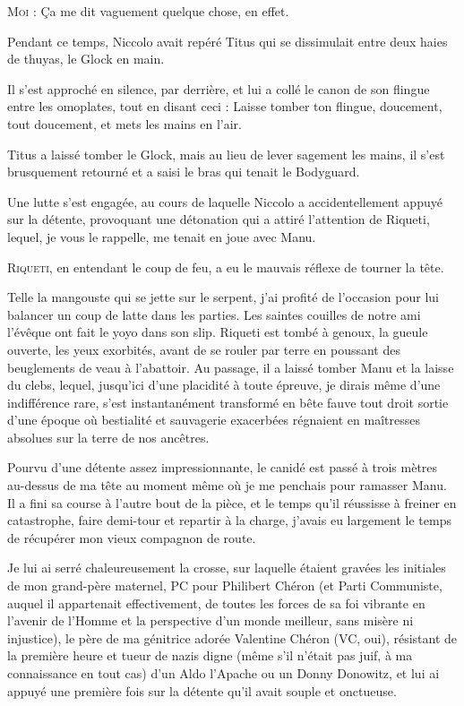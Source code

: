 \textsc{Moi} : Ça me dit vaguement quelque chose, en effet.

Pendant ce temps, Niccolo avait repéré Titus qui se dissimulait entre deux haies de thuyas, le Glock en main.

Il s’est approché en silence, par derrière, et lui a collé le canon de son flingue entre les omoplates, tout en disant ceci : Laisse tomber ton flingue, doucement, tout doucement, et mets les mains en l’air.

Titus a laissé tomber le Glock, mais au lieu de lever sagement les mains, il s’est brusquement retourné et a saisi le bras qui tenait le Bodyguard.

Une lutte s’est engagée, au cours de laquelle Niccolo a accidentellement appuyé sur la détente, provoquant une détonation qui a attiré l’attention de Riqueti, lequel, je vous le rappelle, me tenait en joue avec Manu.

\textsc{Riqueti}, en entendant le coup de feu, a eu le mauvais réflexe de tourner la tête.

Telle la mangouste qui se jette sur le serpent, j’ai profité de l’occasion pour lui balancer un coup de latte dans les parties. Les saintes couilles de notre ami l’évêque ont fait le yoyo dans son slip. Riqueti est tombé à genoux, la gueule ouverte, les yeux exorbités, avant de se rouler par terre en poussant des beuglements de veau à l’abattoir. Au passage, il a laissé tomber Manu et la laisse du clebs, lequel, jusqu’ici d’une placidité à toute épreuve, je dirais même d’une indifférence rare, s’est instantanément transformé en bête fauve tout droit sortie d’une époque où bestialité et sauvagerie exacerbées régnaient en maîtresses absolues sur la terre de nos ancêtres.

Pourvu d’une détente assez impressionnante, le canidé est passé à trois mètres au-dessus de ma tête au moment même où je me penchais pour ramasser Manu. Il a fini sa course à l’autre bout de la pièce, et le temps qu’il réussisse à freiner en catastrophe, faire demi-tour et repartir à la charge, j’avais eu largement le temps de récupérer mon vieux compagnon de route.

Je lui ai serré chaleureusement la crosse, sur laquelle étaient gravées les initiales de mon grand-père maternel, PC pour Philibert Chéron (et Parti Communiste, auquel il appartenait effectivement, de toutes les forces de sa foi vibrante en l’avenir de l’Homme et la perspective d’un monde meilleur, sans misère ni injustice), le père de ma génitrice adorée Valentine Chéron (VC, oui), résistant de la première heure et tueur de nazis digne (même s’il n’était pas juif, à ma connaissance en tout cas) d’un Aldo l’Apache ou un Donny Donowitz, et lui ai appuyé une première fois sur la détente qu’il avait souple et onctueuse.

